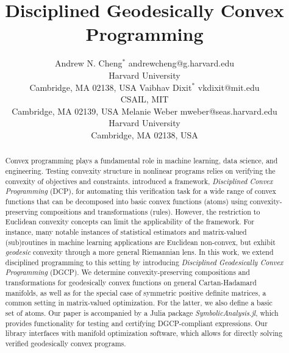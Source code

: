 \documentclass[twoside,11pt]{article}
\begin{document}
\title{Disciplined Geodesically Convex Programming}

\author{\name Andrew N. Cheng$^*$ {\email andrewcheng@g.harvard.edu \\
       \addr Harvard University\\
       Cambridge, MA 02138, USA}
       \AND
       \name Vaibhav Dixit$^*$ {\email vkdixit@mit.edu \\
       \addr CSAIL, MIT\\
       Cambridge, MA 02139, USA}
       \AND
       \name Melanie Weber \email mweber@seas.harvard.edu \\
       \addr Harvard University\\
       Cambridge, MA 02138, USA
       }


\maketitle
\def\thefootnote{*}

\begin{abstract}%
Convex programming plays a fundamental role in machine learning, data science, and engineering. Testing convexity structure in nonlinear programs relies on verifying the convexity of objectives and constraints. \citet{grant2006disciplined} introduced a framework, \emph{Disciplined Convex Programming} (DCP), for automating this verification task for a wide range of convex functions that can be decomposed into basic convex functions (atoms) using convexity-preserving compositions and transformations (rules). However, the restriction to Euclidean convexity concepts can limit the applicability of the framework. For instance, many notable instances of statistical estimators and matrix-valued (sub)routines in machine learning applications are Euclidean non-convex, but exhibit \emph{geodesic} convexity through a more general Riemannian lens. In this work, we extend disciplined programming to this setting by introducing \emph{Disciplined Geodesically Convex Programming} (DGCP). We determine convexity-preserving compositions and transformations for geodesically convex functions on general Cartan-Hadamard manifolds, as well as for the special case of symmetric positive definite matrices, a common setting in matrix-valued optimization. For the latter, we also define a basic set of atoms. Our paper is accompanied by a Julia package \textsl{SymbolicAnalysis.jl}, which provides functionality for testing and certifying DGCP-compliant expressions. Our library interfaces with manifold optimization software, which allows for directly solving verified geodesically convex programs.
\end{abstract}
\end{document}
